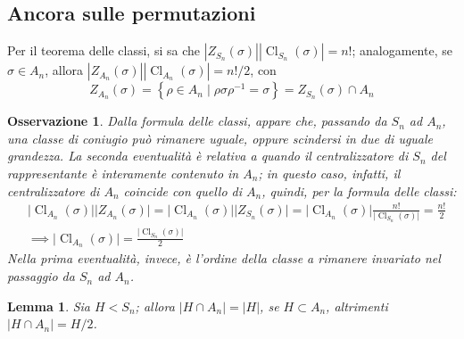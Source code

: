 \documentclass[11pt]{article}
\theoremstyle{style}
\newtheorem{lemma}{Lemma}[teorema]
\newtheorem{osservazione}{Osservazione}[section]
\numberwithin{equation}{subsection}
\begin{document}
\subsection{Ancora sulle permutazioni}
Per il teorema delle classi, si sa che $|Z_{S_n} (\sigma )| |\operatorname{Cl}_{S_n}  (\sigma )| = n!$; analogamente, se $\sigma  \in A_n$, allora $|Z_{A_n} (\sigma )| |\operatorname{Cl} _{A_n} (\sigma )| = n! / 2$, con
\[
Z_{A_n} (\sigma ) = \left\{ \rho \in A_n  \mid \rho \sigma \rho ^{-1}= \sigma  \right\} = Z_{S_n} (\sigma ) \cap A_n
\] 
\begin{osservazione}
Dalla formula delle classi, appare che, passando da $S_n$ ad $A_n$, una classe di coniugio pu\`o rimanere uguale, oppure scindersi in due di uguale grandezza.
La seconda eventualit\`a \`e relativa a quando il centralizzatore di $S_n$ del rappresentante \`e interamente contenuto in $A_n$; in questo caso, infatti, il centralizzatore di $A_n$ coincide con quello di $A_n$, quindi, per la formula delle classi:
\[
	\begin{split}
		&\lvert \operatorname{Cl} _{A_n} (\sigma ) \rvert \lvert Z_{A_n} (\sigma ) \rvert =\lvert \operatorname{Cl} _{A_n} (\sigma ) \rvert \lvert Z_{S_n} (\sigma ) \rvert  =\lvert \operatorname{Cl} _{A_n} (\sigma ) \rvert \frac{n!}{\lvert \operatorname{Cl} _{S_n} (\sigma ) \rvert}  =\frac{n!}{2} \\
		&\implies \lvert \operatorname{Cl} _{A_n} (\sigma ) \rvert=\frac{\lvert \operatorname{Cl} _{S_n} (\sigma ) \rvert}{2}
	\end{split}
\] 
Nella prima eventualit\`a, invece, \`e l'ordine della classe a rimanere invariato nel passaggio da $S_n$ ad $A_n$.
\end{osservazione}
\begin{lemma}
	Sia $H < S_n$; allora $ \lvert H \cap  A_n \rvert = |H|$, se $H \subset A_n$, altrimenti $\lvert H \cap A_n \rvert = H / 2$.
\end{lemma}
\end{document}
